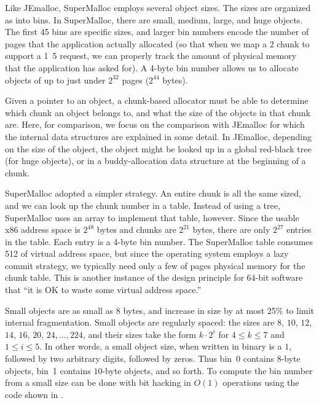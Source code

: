 \documentclass[pldi]{sigplanconf-pldi15}
\begin{document}
Like JEmalloc, SuperMalloc employs several object sizes.  The sizes
are organized as into bins.  In SuperMalloc, there are small, medium,
large, and huge objects.  The first 45 bins are specific sizes, and
larger bin numbers encode the number of pages that the application
actually allocated (so that when we map a \unit{2}\mebi\byte{} chunk
to support a \unit{1.5}\mebi\byte{} request, we can properly track
the amount of physical memory that the application has asked for).  A
4-byte bin number allows us to allocate objects of up to just under
$2^{32}$ pages ($2^{44}$ bytes).

Given a pointer to an object, a chunk-based allocator must be able to
determine which chunk an object belongs to, and what the size of the
objects in that chunk are.  Here, for comparison, we focus on the
comparison with JEmalloc for which the internal data structures are
explained in some detail.  In JEmalloc, depending on the size of the
object, the object might be looked up in a global red-black tree (for
huge objects), or in a buddy-allocation data structure at the
beginning of a chunk.  

SuperMalloc adopted a simpler strategy.  An entire chunk is all the
same sized, and we can look up the chunk number in a table.  Instead
of using a tree, SuperMalloc uses an array to implement that table,
however.  Since the usable x86 address space is $2^{48}$ bytes and
chunks are $2^{21}$ bytes, there are only $2^{27}$ entries in the
table.  Each entry is a 4-byte bin number.  The SuperMalloc table
consumes \unit{512}\mebi\byte{} of virtual address space, but since
the operating system employs a lazy commit strategy, we typically need
only a few of pages physical memory for the chunk table.  This is
another instance of the design principle for 64-bit software that ``it
is OK to waste some virtual address space.''


Small objects are as small as 8 bytes, and increase in size by at most
25\% to limit internal fragmentation.  Small objects are regularly
spaced: the sizes are $8$, $10$, $12$, $14$, $16$, $20$, $24, \ldots,
224$, and their sizes take the form $k\cdot2^i$ for $4\leq k \leq 7$
and $1\leq i \leq 5$.  In other words, a small object size, when
written in binary is a $1$, followed by two arbitrary digits, followed
by zeros.  Thus bin~$0$ contains $8$-byte objects, bin~1 contains
$10$-byte objects, and so forth.  To compute the bin number from a
small size can be done with bit hacking in $O(1)$ operations using the
code shown in .
\end{document}
